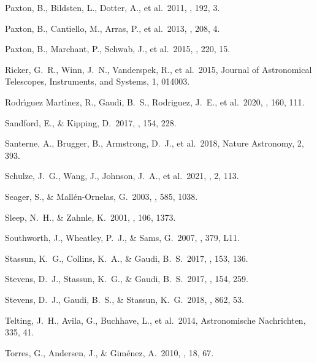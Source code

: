  Paxton, B., Bildsten, L., Dotter, A., et al.\ 2011, \apjs, 192, 3.

 Paxton, B., Cantiello, M., Arras, P., et al.\ 2013, \apjs, 208, 4.

 Paxton, B., Marchant, P., Schwab, J., et al.\ 2015, \apjs, 220, 15.

 Ricker, G.~R., Winn, J.~N., Vanderspek, R., et al.\ 2015, Journal of Astronomical Telescopes, Instruments, and Systems, 1, 014003.

 Rodr{\'\i}guez Mart{\'\i}nez, R., Gaudi, B.~S., Rodriguez, J.~E., et al.\ 2020, \aj, 160, 111.

 Sandford, E., \& Kipping, D.\ 2017, \aj, 154, 228.

 Santerne, A., Brugger, B., Armstrong, D.~J., et al.\ 2018, Nature Astronomy, 2, 393.

 Schulze, J.~G., Wang, J., Johnson, J.~A., et al.\ 2021, \psj, 2, 113.

 Seager, S., \& Mall{\'e}n-Ornelas, G.\ 2003, \apj, 585, 1038.

 Sleep, N.~H., \& Zahnle, K.\ 2001, \jgr, 106, 1373.

 Southworth, J., Wheatley, P.~J., \& Sams, G.\ 2007, \mnras, 379, L11.

 Stassun, K.~G., Collins, K.~A., \& Gaudi, B.~S.\ 2017, \aj, 153, 136.

 Stevens, D.~J., Stassun, K.~G., \& Gaudi, B.~S.\ 2017, \aj, 154, 259.

 Stevens, D.~J., Gaudi, B.~S., \& Stassun, K.~G.\ 2018, \apj, 862, 53.

 Telting, J.~H., Avila, G., Buchhave, L., et al.\ 2014, Astronomische Nachrichten, 335, 41.

 Torres, G., Andersen, J., \& Gim{\'e}nez, A.\ 2010, \aapr, 18, 67.

